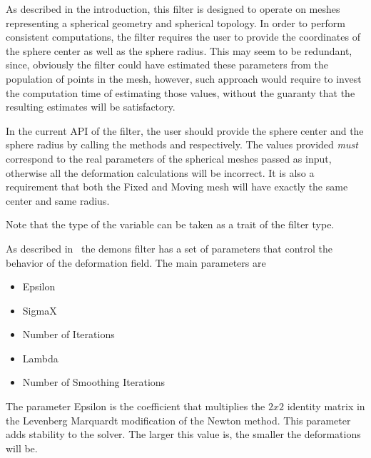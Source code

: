 \documentclass{InsightArticle}
\begin{document}
As described in the introduction, this filter is designed to operate on meshes
representing a spherical geometry and spherical topology. In order to perform
consistent computations, the filter requires the user to provide the
coordinates of the sphere center as well as the sphere radius. This may seem to
be redundant, since, obviously the filter could have estimated these parameters
from the population of points in the mesh, however, such approach would require
to invest the computation time of estimating those values, without the guaranty
that the resulting estimates will be satisfactory.

In the current API of the filter, the user should provide the sphere center and
the sphere radius by calling the methods  and
 respectively. The values provided \emph{must} correspond to
the real parameters of the spherical meshes passed as input, otherwise all the
deformation calculations will be incorrect. It is also a requirement that both
the Fixed and Moving mesh will have exactly the same center and same radius.

\begin{center}

\end{center}

Note that the type of the  variable can be taken as a trait of the
filter type.
 
\begin{center}

\end{center}

As described in~\cite{Yeo2008,Yeo2010} the demons filter has a set of
parameters that control the behavior of the deformation field. The main
parameters are

\begin{itemize}
\item Epsilon
\item SigmaX
\item Number of Iterations
\item Lambda
\item Number of Smoothing Iterations
\end{itemize}

The parameter Epsilon is the coefficient that multiplies the $2x2$ identity
matrix in the Levenberg Marquardt modification of the Newton method. This
parameter adds stability to the solver. The larger this value is, the smaller
the deformations will be.
\end{document}
